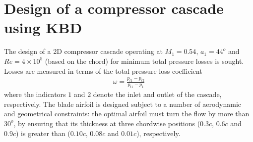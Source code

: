 



\section{Design of a compressor cascade using KBD}
\label{Drela1}
The design of a 2D compressor cascade operating at $M_1\!=\!0.54$, $a_1\!=\!44^o$ and $Re\!=\!4\times10^5$ (based on the chord) for minimum total pressure losses is sought. Losses are measured in terms of the total pressure loss coefficient 
\begin{eqnarray}
   \omega=\frac{p_{t1}-p_{t2}}{p_{t1}-p_1}
   \label{omegaLosses} 
\end{eqnarray}
where the indicators $1$ and $2$ denote the inlet and outlet of the cascade, respectively. 
The blade airfoil is designed subject to a number of aerodynamic and geometrical constraints: the optimal airfoil must turn the flow by more than $30^o$, by ensuring that its thickness at three chordwise positions ($0.3c$, $0.6c$ and $0.9c$) is greater than ($0.10c$, $0.08c$ and $0.01c$),  respectively.     

